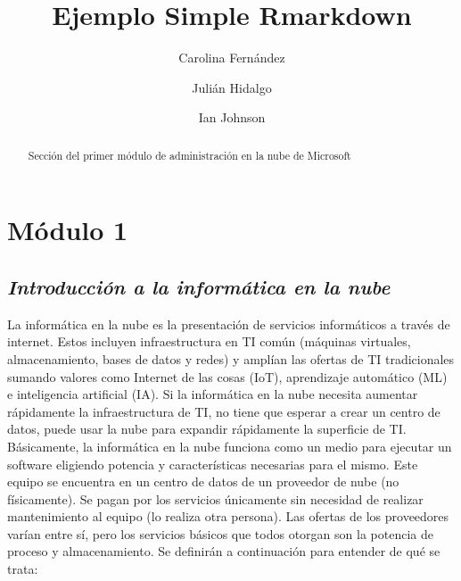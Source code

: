 \documentclass[runningheads]{llncs}
\begin{document}
\title{Ejemplo Simple Rmarkdown}
%
%
\author{Carolina
Fernández\inst{} \and Julián
Hidalgo\inst{} \and Ian
Johnson\inst{}}


%


\maketitle              %
%
\begin{abstract}
Sección del primer módulo de administración en la nube de Microsoft


\end{abstract}

\hypertarget{muxf3dulo-1}{%
\section{Módulo 1}\label{muxf3dulo-1}}

\hypertarget{introducciuxf3n-a-la-informuxe1tica-en-la-nube}{%
\subsection{\texorpdfstring{\emph{Introducción a la informática en la
nube}}{Introducción a la informática en la nube}}\label{introducciuxf3n-a-la-informuxe1tica-en-la-nube}}

La informática en la nube es la presentación de servicios informáticos a
través de internet. Estos incluyen infraestructura en TI común (máquinas
virtuales, almacenamiento, bases de datos y redes) y amplían las ofertas
de TI tradicionales sumando valores como Internet de las cosas (IoT),
aprendizaje automático (ML) e inteligencia artificial (IA). Si la
informática en la nube necesita aumentar rápidamente la infraestructura
de TI, no tiene que esperar a crear un centro de datos, puede usar la
nube para expandir rápidamente la superficie de TI. Básicamente, la
informática en la nube funciona como un medio para ejecutar un software
eligiendo potencia y características necesarias para el mismo. Este
equipo se encuentra en un centro de datos de un proveedor de nube (no
físicamente). Se pagan por los servicios únicamente sin necesidad de
realizar mantenimiento al equipo (lo realiza otra persona). Las ofertas
de los proveedores varían entre sí, pero los servicios básicos que todos
otorgan son la potencia de proceso y almacenamiento. Se definirán a
continuación para entender de qué se trata:
\end{document}
